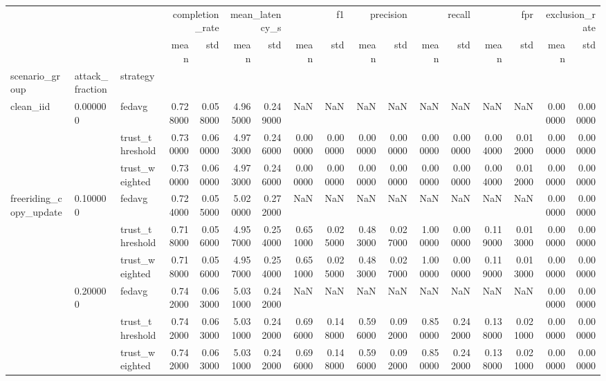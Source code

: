 \begin{tabular}{lllrrrrrrrrrrrrrr}
\toprule
 &  &  & \multicolumn{2}{r}{completion_rate} & \multicolumn{2}{r}{mean_latency_s} & \multicolumn{2}{r}{f1} & \multicolumn{2}{r}{precision} & \multicolumn{2}{r}{recall} & \multicolumn{2}{r}{fpr} & \multicolumn{2}{r}{exclusion_rate} \\
 &  &  & mean & std & mean & std & mean & std & mean & std & mean & std & mean & std & mean & std \\
scenario_group & attack_fraction & strategy &  &  &  &  &  &  &  &  &  &  &  &  &  &  \\
\midrule
\multirow[t]{3}{*}{clean_iid} & \multirow[t]{3}{*}{0.000000} & fedavg & 0.728000 & 0.058000 & 4.965000 & 0.249000 & NaN & NaN & NaN & NaN & NaN & NaN & NaN & NaN & 0.000000 & 0.000000 \\
 &  & trust_threshold & 0.730000 & 0.060000 & 4.973000 & 0.246000 & 0.000000 & 0.000000 & 0.000000 & 0.000000 & 0.000000 & 0.000000 & 0.004000 & 0.012000 & 0.000000 & 0.000000 \\
 &  & trust_weighted & 0.730000 & 0.060000 & 4.973000 & 0.246000 & 0.000000 & 0.000000 & 0.000000 & 0.000000 & 0.000000 & 0.000000 & 0.004000 & 0.012000 & 0.000000 & 0.000000 \\
\cline{1-17} \cline{2-17}
\multirow[t]{12}{*}{freeriding_copy_update} & \multirow[t]{3}{*}{0.100000} & fedavg & 0.724000 & 0.055000 & 5.020000 & 0.272000 & NaN & NaN & NaN & NaN & NaN & NaN & NaN & NaN & 0.000000 & 0.000000 \\
 &  & trust_threshold & 0.718000 & 0.056000 & 4.957000 & 0.254000 & 0.651000 & 0.025000 & 0.483000 & 0.027000 & 1.000000 & 0.000000 & 0.119000 & 0.013000 & 0.000000 & 0.000000 \\
 &  & trust_weighted & 0.718000 & 0.056000 & 4.957000 & 0.254000 & 0.651000 & 0.025000 & 0.483000 & 0.027000 & 1.000000 & 0.000000 & 0.119000 & 0.013000 & 0.000000 & 0.000000 \\
\cline{2-17}
 & \multirow[t]{3}{*}{0.200000} & fedavg & 0.742000 & 0.063000 & 5.031000 & 0.242000 & NaN & NaN & NaN & NaN & NaN & NaN & NaN & NaN & 0.000000 & 0.000000 \\
 &  & trust_threshold & 0.742000 & 0.063000 & 5.031000 & 0.242000 & 0.696000 & 0.148000 & 0.596000 & 0.092000 & 0.850000 & 0.242000 & 0.138000 & 0.021000 & 0.000000 & 0.000000 \\
 &  & trust_weighted & 0.742000 & 0.063000 & 5.031000 & 0.242000 & 0.696000 & 0.148000 & 0.596000 & 0.092000 & 0.850000 & 0.242000 & 0.138000 & 0.021000 & 0.000000 & 0.000000 \\

\end{tabular}
